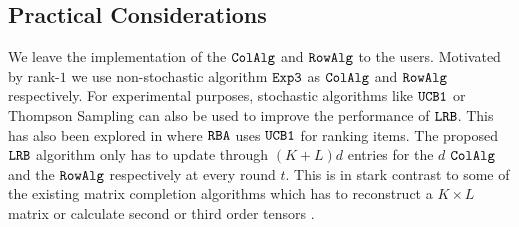 \subsection{Practical Considerations}
\label{sec:practical considerations}
We leave the implementation of the ${\tt ColAlg}$ and ${\tt RowAlg}$ to the users.  Motivated by rank-$1$ we use non-stochastic algorithm ${\tt Exp3}$ as ${\tt ColAlg}$ and ${\tt RowAlg}$ respectively. For experimental purposes, stochastic algorithms like ${\tt UCB1}$ or Thompson Sampling can also be used to improve the performance of ${\tt LRB}$. This has also been explored in \citet{radlinski2008learning} where ${\tt RBA}$ uses ${\tt UCB1}$ for ranking items. The proposed ${\tt LRB}$ algorithm only has to update through $(K + L)d$ entries for the $d$ ${\tt ColAlg}$ and the ${\tt RowAlg}$ respectively at every round $t$. This is in stark contrast to some of the existing matrix completion algorithms which has to reconstruct a $K\times L$ matrix \citep{sen2016contextual} or calculate second or third order tensors \citep{gopalan2016low}. 

